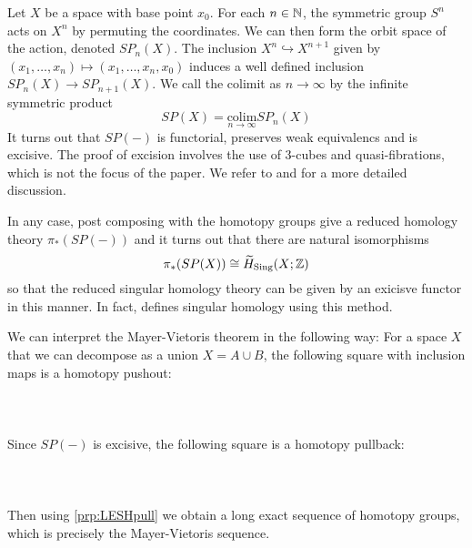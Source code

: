 \begin{eg}\label{eg:RedHomlogy} Let $X$ be a space with base point $x_0$. For each $n\in\mathbb{N}$, the symmetric group $S^n$ acts on $X^n$ by permuting the coordinates. We can then form the orbit space of the action, denoted $SP_n(X)$. The inclusion $X^n\hookrightarrow X^{n+1}$ given by $(x_1,\dots,x_n)\mapsto(x_1,\dots,x_n,x_0)$ induces a well defined inclusion $SP_n(X)\to SP_{n+1}(X)$. We call the colimit as $n\to\infty$ by the infinite symmetric product $$SP(X)=\underset{n\to\infty}{\text{colim}}SP_n(X)$$ It turns out that $SP(-)$ is functorial, preserves weak equivalencs and is excisive. The proof of excision involves the use of 3-cubes and quasi-fibrations, which is not the focus of the paper. We refer to \cite{CHT} and \cite{ATHV} for a more detailed discussion. 

In any case, post composing with the homotopy groups give a reduced homology theory $\pi_\ast(SP(-))$ and it turns out that there are natural isomorphisms $$\pi_\ast(SP(X))\cong\widetilde{H}_{\text{Sing}}(X;\mathbb{Z})$$ so that the reduced singular homology theory can be given by an exicisve functor in this manner. In fact, \cite{ATHV} defines singular homology using this method. 

We can interpret the Mayer-Vietoris theorem in the following way: For a space $X$ that we can decompose as a union $X=A\cup B$, the following square with inclusion maps is a homotopy pushout: 
 \\~\\  \\~\\
Since $SP(-)$ is excisive, the following square is a homotopy pullback: 
 \\~\\  \\~\\
Then using \ref{prp:LESHpull} we obtain a long exact sequence of homotopy groups, which is precisely the Mayer-Vietoris sequence. 
\end{eg}

